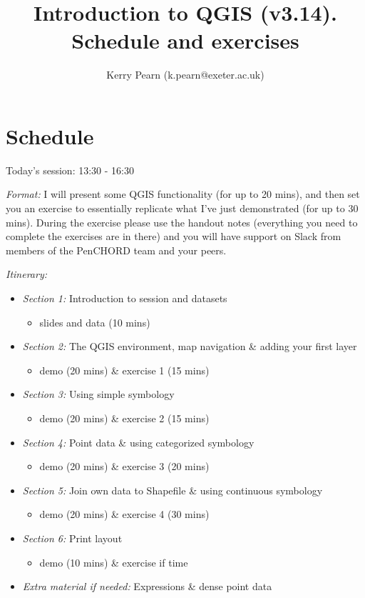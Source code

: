 \documentclass{article}
\title{Introduction to QGIS (v3.14).\\
	\vspace{0.5cm}
	\large{Schedule and exercises}}
\author[1]{Kerry Pearn (k.pearn@exeter.ac.uk)}
\begin{document}
	
\maketitle
	
\section{Schedule} 
	
Today's session: 13:30 - 16:30

\emph{Format:} I will present some QGIS functionality (for up to 20 mins), and then set you an exercise to essentially replicate what I've just demonstrated (for up to 30 mins). During the exercise please use the handout notes (everything you need to complete the exercises are in there) and you will have support on Slack from members of the PenCHORD team and your peers. %

\emph{Itinerary:}
\begin{itemize}
	\item \emph{Section 1:} Introduction to session and datasets 
	\begin{itemize}
		\item slides and data (10 mins)
	\end{itemize}
		
	\item \emph{Section 2:} The QGIS environment, map navigation \& adding your first layer 
	\begin{itemize}
		\item demo (20 mins) \& exercise 1 (15 mins)
	\end{itemize}
	
	\item \emph{Section 3:} Using simple symbology
	\begin{itemize}
		\item demo (20 mins) \& exercise 2 (15 mins)
	\end{itemize}
	
	\item \emph{Section 4:} Point data \& using categorized symbology
	\begin{itemize}
		\item demo (20 mins) \& exercise 3 (20 mins)
	\end{itemize}
	
	\item \emph{Section 5:} Join own data to Shapefile \& using continuous symbology
	\begin{itemize}
		\item demo (20 mins) \& exercise 4 (30 mins)
	\end{itemize}
	
	\item \emph{Section 6:} Print layout
	\begin{itemize}
		\item demo (10 mins) \& exercise if time
	\end{itemize}
	
	\item \emph{Extra material if needed:} Expressions \& dense point data
\end{itemize}
\end{document}
